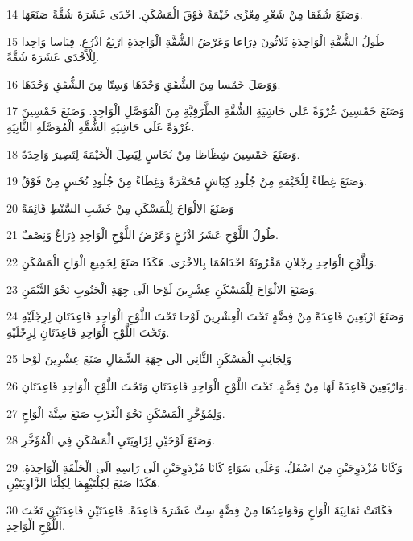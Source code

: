\par 14 وَصَنَعَ شُقَقا مِنْ شَعْرِ مِعْزًى خَيْمَةً فَوْقَ الْمَسْكَنِ. احْدَى عَشَرَةَ شُقَّةً صَنَعَهَا.
\par 15 طُولُ الشُّقَّةِ الْوَاحِدَةِ ثَلاثُونَ ذِرَاعا وَعَرْضُ الشُّقَّةِ الْوَاحِدَةِ ارْبَعُ اذْرُعٍ. قِيَاسا وَاحِدا لِلْاحْدَى عَشَرَةَ شُقَّةً.
\par 16 وَوَصَلَ خَمْسا مِنَ الشُّقَقِ وَحْدَهَا وَسِتّا مِنَ الشُّقَقِ وَحْدَهَا.
\par 17 وَصَنَعَ خَمْسِينَ عُرْوَةً عَلَى حَاشِيَةِ الشُّقَّةِ الطَّرَفِيَّةِ مِنَ الْمُوَصَّلِ الْوَاحِدِ. وَصَنَعَ خَمْسِينَ عُرْوَةً عَلَى حَاشِيَةِ الشُّقَّةِ الْمُوَصَّلَةِ الثَّانِيَةِ.
\par 18 وَصَنَعَ خَمْسِينَ شِظَاظا مِنْ نُحَاسٍ لِيَصِلَ الْخَيْمَةَ لِتَصِيرَ وَاحِدَةً.
\par 19 وَصَنَعَ غِطَاءً لِلْخَيْمَةِ مِنْ جُلُودِ كِبَاشٍ مُحَمَّرَةً وَغِطَاءً مِنْ جُلُودِ تُخَسٍ مِنْ فَوْقُ.
\par 20 وَصَنَعَ الالْوَاحَ لِلْمَسْكَنِ مِنْ خَشَبِ السَّنْطِ قَائِمَةً
\par 21 طُولُ اللَّوْحِ عَشَرُ اذْرُعٍ وَعَرْضُ اللَّوْحِ الْوَاحِدِ ذِرَاعٌ وَنِصْفٌ.
\par 22 وَلِلَّوْحِ الْوَاحِدِ رِجْلانِ مَقْرُونَةٌ احْدَاهُمَا بِالاخْرَى. هَكَذَا صَنَعَ لِجَمِيعِ الْوَاحِ الْمَسْكَنِ.
\par 23 وَصَنَعَ الالْوَاحَ لِلْمَسْكَنِ عِشْرِينَ لَوْحا الَى جِهَةِ الْجَنُوبِ نَحْوَ التَّيْمَنِ.
\par 24 وَصَنَعَ ارْبَعِينَ قَاعِدَةً مِنْ فِضَّةٍ تَحْتَ الْعِشْرِينَ لَوْحا تَحْتَ اللَّوْحِ الْوَاحِدِ قَاعِدَتَانِ لِرِجْلَيْهِ وَتَحْتَ اللَّوْحِ الْوَاحِدِ قَاعِدَتَانِ لِرِجْلَيْهِ.
\par 25 وَلِجَانِبِ الْمَسْكَنِ الثَّانِي الَى جِهَةِ الشِّمَالِ صَنَعَ عِشْرِينَ لَوْحا
\par 26 وَارْبَعِينَ قَاعِدَةً لَهَا مِنْ فِضَّةٍ. تَحْتَ اللَّوْحِ الْوَاحِدِ قَاعِدَتَانِ وَتَحْتَ اللَّوْحِ الْوَاحِدِ قَاعِدَتَانِ.
\par 27 وَلِمُؤَخَّرِ الْمَسْكَنِ نَحْوَ الْغَرْبِ صَنَعَ سِتَّةَ الْوَاحٍ.
\par 28 وَصَنَعَ لَوْحَيْنِ لِزَاوِيَتَيِ الْمَسْكَنِ فِي الْمُؤَخَّرِ.
\par 29 وَكَانَا مُزْدَوِجَيْنِ مِنْ اسْفَلُ. وَعَلَى سَوَاءٍ كَانَا مُزْدَوِجَيْنِ الَى رَاسِهِ الَى الْحَلْقَةِ الْوَاحِدَةِ. هَكَذَا صَنَعَ لِكِلْتَيْهِمَا لِكِلْتَا الزَّاوِيَتَيْنِ.
\par 30 فَكَانَتْ ثَمَانِيَةَ الْوَاحٍ وَقَوَاعِدُهَا مِنْ فِضَّةٍ سِتَّ عَشَرَةَ قَاعِدَةً. قَاعِدَتَيْنِ قَاعِدَتَيْنِ تَحْتَ اللَّوْحِ الْوَاحِدِ.
